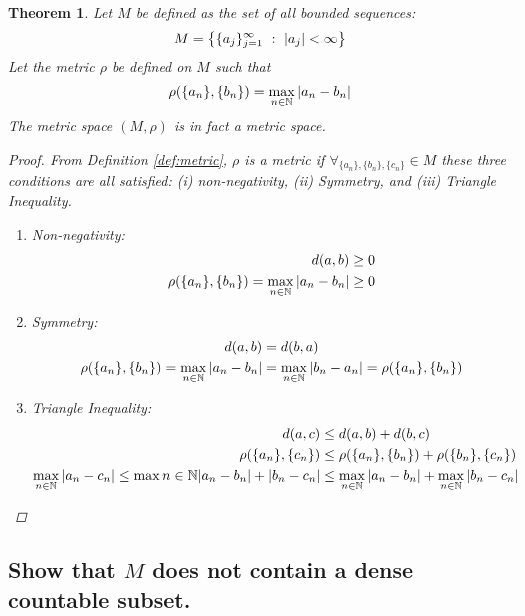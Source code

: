\documentclass[]{article}
\newcommand{\N}{\mathbb{N}}
\newcommand{\st}{\ : \ }
\newtheorem{theorem}{Theorem}
\begin{document}
\begin{theorem}
    Let $M$ be defined as the set of all bounded sequences:\[
        M = \qty{\{a_j\}_{j=1}^{\infty} \st \abs{a_j} < \infty}
    \]
    Let the metric $\rho$ be defined on $M$ such that\[
        \rho(\{a_n\},\{b_n\}) = \max_{n\in\N} \abs{a_n - b_n}
    \]
    The metric space $(M, \rho)$ is in fact a metric space.
    \begin{proof}
        From Definition \ref{def:metric}, $\rho$ is a metric if 
        $\forall_{\{a_n\},\{b_n\},\{c_n\}} \in M$ 
        these three conditions are all satisfied: 
            (i) non-negativity, 
            (ii) Symmetry, and 
            (iii) Triangle Inequality.
        \begin{enumerate}
            \item Non-negativity:
            \begin{align*}
                d(a,b) &\geq 0\\
                \rho(\{a_n\},\{b_n\}) = \max_{n \in \N} \abs{a_n - b_n} &\geq 0\\
            \end{align*}
            \item Symmetry:
            \begin{align*}
                d(a,b) &= d(b,a)\\
                \rho(\{a_n\},\{b_n\}) = \max_{n \in \N} \abs{a_n - b_n} 
                    &= \max_{n \in \N} \abs{b_n - a_n} = \rho(\{a_n\},\{b_n\})
            \end{align*}
            \item Triangle Inequality:
            \begin{align*}
                d(a,c) &\leq d(a,b) + d(b,c)\\
                \rho(\{a_n\},\{c_n\}) 
                    &\leq \rho(\{a_n\},\{b_n\}) + \rho(\{b_n\},\{c_n\})\\
                \max_{n \in \N} \abs{a_n - c_n} 
                    \leq \max{n \in \N} \abs{a_n - b_n} + \abs{b_n - c_n}    
                    &\leq \max_{n \in \N} \abs{a_n - b_n} 
                        + \max_{n \in \N} \abs{b_n - c_n}
            \end{align*}
        \end{enumerate}
    \end{proof}
\end{theorem}


\newpage
\subsection{Show that $M$ does not contain a dense countable subset.}
\end{document}
